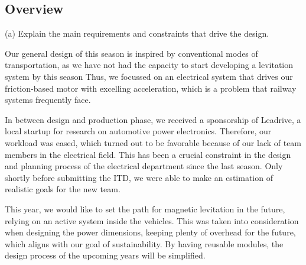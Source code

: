 \subsection{Overview}
(a) Explain the main requirements and constraints that drive the design. \\
\par Our general design of this season is inspired by conventional modes of transportation,
as we have not had the capacity to start developing a levitation system by this season
Thus, we focussed on an electrical system that drives our friction-based motor with
excelling acceleration, which is a problem that railway systems frequently face.

\par In between design and production phase, we received a sponsorship of Leadrive,
a local startup for research on automotive power electronics.
Therefore, our workload was eased, which turned out to be favorable
because of our lack of team members in the electrical field. This has been a crucial
constraint in the design and planning process of the electrical department
since the last season. Only shortly before submitting the ITD, we were able to make an estimation of
realistic goals for the new team.

\par This year, we would like to set the path for magnetic levitation in the future, relying on an active system
inside the vehicles. This was taken into consideration when designing the power dimensions,
keeping plenty of overhead for the future, which aligns with our goal of sustainability.
By having reusable modules, the design process of the upcoming years will be simplified.

